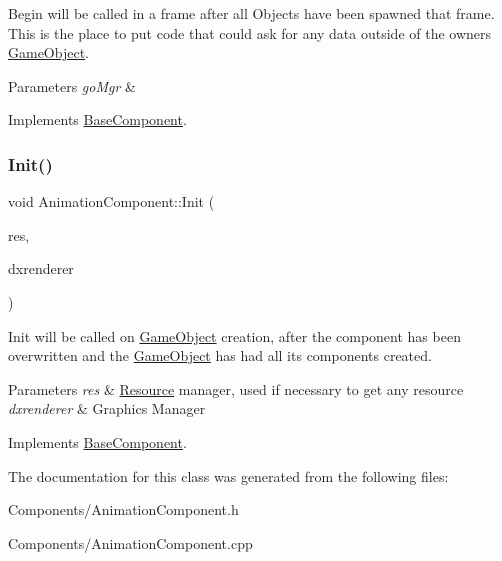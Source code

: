 Begin will be called in a frame after all Objects have been spawned that frame. This is the place to put code that could ask for any data outside of the owner\textquotesingle{}s \hyperlink{classGameObject}{Game\+Object}. 


\begin{DoxyParams}{Parameters}
{\em go\+Mgr} & \\
\hline
\end{DoxyParams}


Implements \hyperlink{classBaseComponent}{Base\+Component}.

\mbox{\label{classAnimationComponent_a7847ca35ed87a7d2156081ad41822de4}} 
\subsubsection{\texorpdfstring{Init()}{Init()}}
{\footnotesize\ttfamily void Animation\+Component\+::\+Init (\begin{DoxyParamCaption}\item[{\hyperlink{classResourceManager}{Resource\+Manager} $\ast$}]{res,  }\item[{\hyperlink{classDXRenderer}{D\+X\+Renderer} $\ast$}]{dxrenderer }\end{DoxyParamCaption})\hspace{0.3cm}{\ttfamily [virtual]}}



Init will be called on \hyperlink{classGameObject}{Game\+Object} creation, after the component has been overwritten and the \hyperlink{classGameObject}{Game\+Object} has had all its components created. 


\begin{DoxyParams}{Parameters}
{\em res} & \hyperlink{structResource}{Resource} manager, used if necessary to get any resource \\
\hline
{\em dxrenderer} & Graphic\textquotesingle{}s Manager \\
\hline
\end{DoxyParams}


Implements \hyperlink{classBaseComponent}{Base\+Component}.



The documentation for this class was generated from the following files\+:\begin{DoxyCompactItemize}
\item 
Components/Animation\+Component.\+h\item 
Components/Animation\+Component.\+cpp\end{DoxyCompactItemize}
